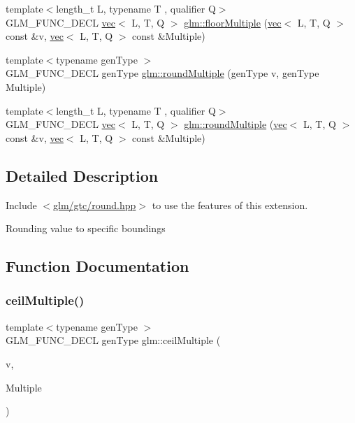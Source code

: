 \begin{DoxyCompactItemize}
\item 
{\footnotesize template$<$length\+\_\+t L, typename T , qualifier Q$>$ }\\G\+L\+M\+\_\+\+F\+U\+N\+C\+\_\+\+D\+E\+CL \hyperlink{structglm_1_1vec}{vec}$<$ L, T, Q $>$ \hyperlink{group__gtc__round_gacdd8901448f51f0b192380e422fae3e4}{glm\+::floor\+Multiple} (\hyperlink{structglm_1_1vec}{vec}$<$ L, T, Q $>$ const \&v, \hyperlink{structglm_1_1vec}{vec}$<$ L, T, Q $>$ const \&Multiple)
\item 
{\footnotesize template$<$typename gen\+Type $>$ }\\G\+L\+M\+\_\+\+F\+U\+N\+C\+\_\+\+D\+E\+CL gen\+Type \hyperlink{group__gtc__round_gab892defcc9c0b0618df7251253dc0fbb}{glm\+::round\+Multiple} (gen\+Type v, gen\+Type Multiple)
\item 
{\footnotesize template$<$length\+\_\+t L, typename T , qualifier Q$>$ }\\G\+L\+M\+\_\+\+F\+U\+N\+C\+\_\+\+D\+E\+CL \hyperlink{structglm_1_1vec}{vec}$<$ L, T, Q $>$ \hyperlink{group__gtc__round_ga2f1a68332d761804c054460a612e3a4b}{glm\+::round\+Multiple} (\hyperlink{structglm_1_1vec}{vec}$<$ L, T, Q $>$ const \&v, \hyperlink{structglm_1_1vec}{vec}$<$ L, T, Q $>$ const \&Multiple)
\end{DoxyCompactItemize}


\subsection{Detailed Description}
Include $<$\hyperlink{round_8hpp}{glm/gtc/round.\+hpp}$>$ to use the features of this extension.

Rounding value to specific boundings 

\subsection{Function Documentation}
\mbox{\label{group__gtc__round_ga1d89ac88582aaf4d5dfa5feb4a376fd4}} 
\subsubsection{\texorpdfstring{ceil\+Multiple()}{ceilMultiple()}\hspace{0.1cm}{\footnotesize\ttfamily [1/2]}}
{\footnotesize\ttfamily template$<$typename gen\+Type $>$ \\
G\+L\+M\+\_\+\+F\+U\+N\+C\+\_\+\+D\+E\+CL gen\+Type glm\+::ceil\+Multiple (\begin{DoxyParamCaption}\item[{gen\+Type}]{v,  }\item[{gen\+Type}]{Multiple }\end{DoxyParamCaption})}



